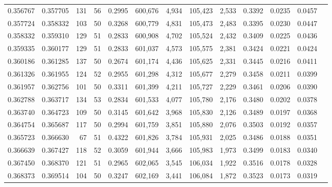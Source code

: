 \begin{tabular}{rrrrrrrrrrrrr}
0.356767 & 0.357705 &   131 &  56 &                                     0.2995 & 600,676 &   4,934 & 105,423 &   2,533 & 0.3392 & 0.0235 & 0.0457 \\
0.357724 & 0.358332 &   103 &  50 &                                     0.3268 & 600,779 &   4,831 & 105,473 &   2,483 & 0.3395 & 0.0230 & 0.0447 \\
0.358332 & 0.359310 &   129 &  51 &                                     0.2833 & 600,908 &   4,702 & 105,524 &   2,432 & 0.3409 & 0.0225 & 0.0436 \\
0.359335 & 0.360177 &   129 &  51 &                                     0.2833 & 601,037 &   4,573 & 105,575 &   2,381 & 0.3424 & 0.0221 & 0.0424 \\
0.360186 & 0.361285 &   137 &  50 &                                     0.2674 & 601,174 &   4,436 & 105,625 &   2,331 & 0.3445 & 0.0216 & 0.0411 \\
0.361326 & 0.361955 &   124 &  52 &                                     0.2955 & 601,298 &   4,312 & 105,677 &   2,279 & 0.3458 & 0.0211 & 0.0399 \\
0.361957 & 0.362756 &   101 &  50 &                                     0.3311 & 601,399 &   4,211 & 105,727 &   2,229 & 0.3461 & 0.0206 & 0.0390 \\
0.362788 & 0.363717 &   134 &  53 &                                     0.2834 & 601,533 &   4,077 & 105,780 &   2,176 & 0.3480 & 0.0202 & 0.0378 \\
0.363740 & 0.364723 &   109 &  50 &                                     0.3145 & 601,642 &   3,968 & 105,830 &   2,126 & 0.3489 & 0.0197 & 0.0368 \\
0.364754 & 0.365687 &   117 &  50 &                                     0.2994 & 601,759 &   3,851 & 105,880 &   2,076 & 0.3503 & 0.0192 & 0.0357 \\
0.365723 & 0.366630 &    67 &  51 &                                     0.4322 & 601,826 &   3,784 & 105,931 &   2,025 & 0.3486 & 0.0188 & 0.0351 \\
0.366639 & 0.367427 &   118 &  52 &                                     0.3059 & 601,944 &   3,666 & 105,983 &   1,973 & 0.3499 & 0.0183 & 0.0340 \\
0.367450 & 0.368370 &   121 &  51 &                                     0.2965 & 602,065 &   3,545 & 106,034 &   1,922 & 0.3516 & 0.0178 & 0.0328 \\
0.368373 & 0.369514 &   104 &  50 &                                     0.3247 & 602,169 &   3,441 & 106,084 &   1,872 & 0.3523 & 0.0173 & 0.0319 \\

\end{tabular}
